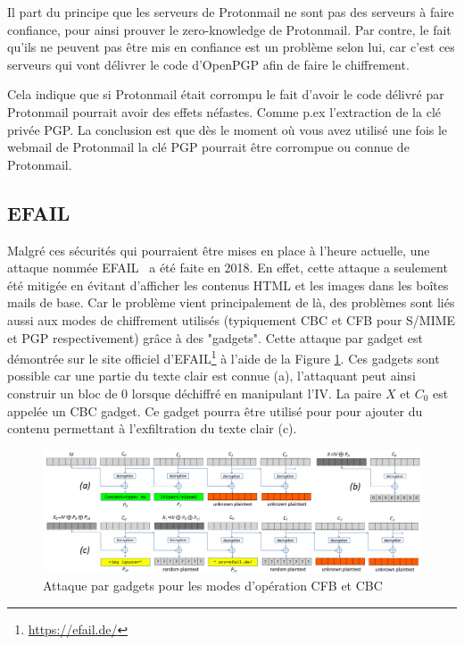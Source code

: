 Il part du principe que les serveurs de Protonmail ne sont pas des serveurs à faire confiance, pour ainsi prouver le zero-knowledge de Protonmail. Par contre, le fait qu'ils ne peuvent pas être mis en confiance est un problème selon lui, car c'est ces serveurs qui vont délivrer le code d'OpenPGP afin de faire le chiffrement.

Cela indique que si Protonmail était corrompu le fait d'avoir le code délivré par Protonmail pourrait avoir des effets néfastes. Comme p.ex l'extraction de la clé privée PGP. La conclusion est que dès le moment où vous avez utilisé une fois le webmail de Protonmail la clé PGP pourrait être corrompue ou connue de Protonmail.
\subsection{EFAIL}
\label{attacks:EFAIL}
Malgré ces sécurités qui pourraient être mises en place à l’heure actuelle, une attaque nommée EFAIL~\cite{conf/uss/PoddebniakD0ISF18} a été faite en 2018. En effet, cette attaque a seulement été mitigée en évitant d’afficher les contenus HTML et les images dans les boîtes mails de base. Car le problème vient principalement de là, des problèmes sont liés aussi aux modes de chiffrement utilisés (typiquement CBC et CFB pour S/MIME et PGP respectivement) grâce à des "gadgets". Cette attaque par gadget est démontrée sur le site officiel d'EFAIL\footnote{\url{https://efail.de/}} à l'aide de la Figure \ref{fig:efailAttack}. Ces gadgets sont possible car une partie du texte clair est connue (a), l'attaquant peut ainsi construir un bloc de 0 lorsque déchiffré en manipulant l'IV. La paire $X$ et $C_0$ est appelée un CBC gadget. Ce gadget pourra être utilisé pour pour ajouter du contenu permettant à l'exfiltration du texte clair (c).

\begin{figure}[h!]
	\includegraphics[width=\textwidth]{images/efail-attack.png}
	\centering
	\caption{Attaque par gadgets pour les modes d'opération CFB et CBC}
	\label{fig:efailAttack}
\end{figure}

